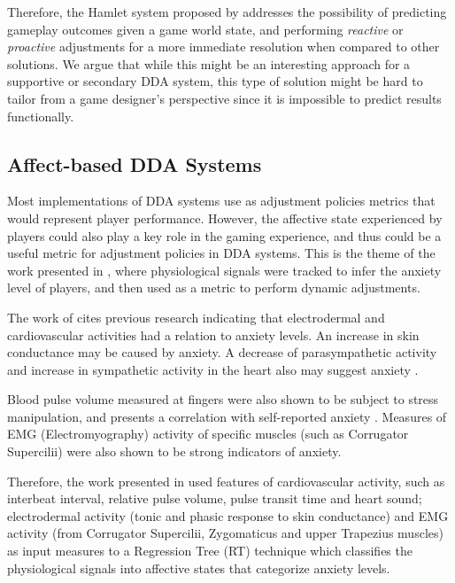 \documentclass[cic,tc,english]{iiufrgs}
\begin{document}
Therefore, the Hamlet system proposed by \citet{article_casefordynamicdifficulty} addresses the possibility of predicting gameplay outcomes given a game world state, and performing \emph{reactive} or \emph{proactive} adjustments for a more immediate resolution when compared to other solutions. We argue that while this might be an interesting approach for a supportive or secondary DDA system, this type of solution might be hard to tailor from a game designer's perspective since it is impossible to predict results functionally.

\subsection{Affect-based DDA Systems}

Most implementations of DDA systems use as adjustment policies metrics that would represent player performance. However, the affective state experienced by players could also play a key role in the gaming experience, and thus could be a useful metric for adjustment policies in DDA systems. This is the theme of the work presented in \cite{article_affectivedda}, where physiological signals were tracked to infer the anxiety level of players, and then used as a metric to perform dynamic adjustments.

The work of \citet{article_affectivedda} cites previous research indicating that electrodermal and cardiovascular activities had a relation to anxiety levels. An increase in skin conductance may be caused by anxiety. A decrease of parasympathetic activity and increase in sympathetic activity in the heart also may suggest anxiety \cite{article_affectivedda}.

Blood pulse volume measured at fingers were also shown to be subject to stress manipulation, and presents a correlation with self-reported anxiety \cite{article_affectivedda}. Measures of EMG (Electromyography) activity of specific muscles (such as Corrugator Supercilii) were also shown to be strong indicators of anxiety.

Therefore, the work presented in \cite{article_affectivedda} used features of cardiovascular activity, such as interbeat interval, relative pulse volume, pulse transit time and heart sound; electrodermal activity (tonic and phasic response to skin conductance) and EMG activity (from Corrugator Supercilii, Zygomaticus and upper Trapezius muscles) as input measures to a Regression Tree (RT) technique which classifies the physiological signals into affective states that categorize anxiety levels.
\end{document}

